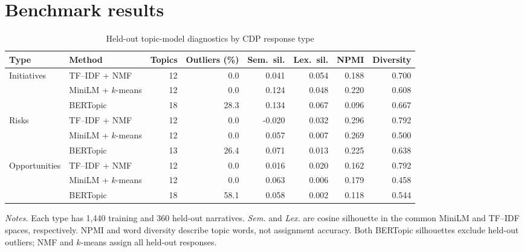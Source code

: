 \documentclass[11pt,a4paper]{article}
\begin{document}
\section{Benchmark results}
\begin{table}[htbp]
\centering
\caption{Held-out topic-model diagnostics by CDP response type}
\label{tab:models}
\small
\setlength{\tabcolsep}{4.0pt}
\begin{tabular}{llrrrrrr}
\toprule
Type & Method & Topics & Outliers (\%) & Sem.\ sil. & Lex.\ sil. & NPMI & Diversity \\
\midrule
Initiatives & TF--IDF + NMF       & 12 & 0.0  &  0.041 & 0.054 & 0.188 & 0.700 \\
            & MiniLM + $k$-means & 12 & 0.0  &  0.124 & 0.048 & 0.220 & 0.608 \\
            & BERTopic           & 18 & 28.3 &  0.134 & 0.067 & 0.096 & 0.667 \\
\addlinespace
Risks       & TF--IDF + NMF       & 12 & 0.0  & -0.020 & 0.032 & 0.296 & 0.792 \\
            & MiniLM + $k$-means & 12 & 0.0  &  0.057 & 0.007 & 0.269 & 0.500 \\
            & BERTopic           & 13 & 26.4 &  0.071 & 0.013 & 0.225 & 0.638 \\
\addlinespace
Opportunities & TF--IDF + NMF       & 12 & 0.0  & 0.016 & 0.020 & 0.162 & 0.792 \\
              & MiniLM + $k$-means & 12 & 0.0  & 0.063 & 0.006 & 0.179 & 0.458 \\
              & BERTopic           & 18 & 58.1 & 0.058 & 0.002 & 0.118 & 0.544 \\
\bottomrule
\end{tabular}

\vspace{3pt}
\begin{minipage}{0.98\linewidth}\footnotesize
\emph{Notes.} Each type has 1,440 training and 360 held-out narratives.
\emph{Sem.} and \emph{Lex.} are cosine silhouette in the common MiniLM and
TF--IDF spaces, respectively. NPMI and word diversity describe topic words,
not assignment accuracy. Both BERTopic silhouettes exclude held-out outliers;
NMF and $k$-means assign all held-out responses.
\end{minipage}
\end{table}
\end{document}
